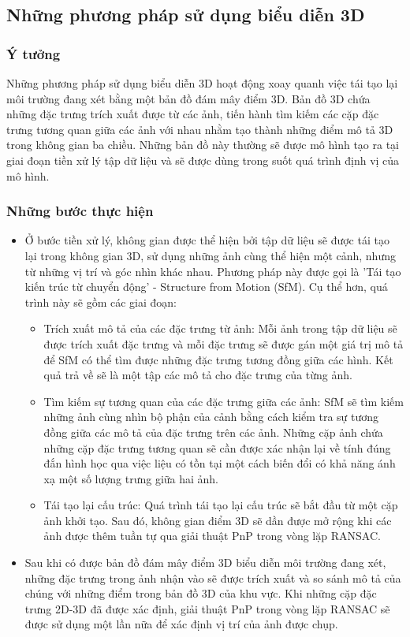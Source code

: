 \subsection{Những phương pháp sử dụng biểu diễn 3D}
\subsubsection*{Ý tưởng}
Những phương pháp sử dụng biểu diễn 3D hoạt động xoay quanh việc tái tạo lại môi trường đang xét bằng một bản đồ đám mây điểm 3D. Bản đồ 3D chứa những đặc trưng trích xuất được từ các ảnh, tiến hành tìm kiếm các cặp đặc trưng tương quan giữa các ảnh với nhau nhằm tạo thành những điểm mô tả 3D trong không gian ba chiều. Những bản đồ này thường sẽ được mô hình tạo ra tại giai đoạn tiền xử lý tập dữ liệu và sẽ được dùng trong suốt quá trình định vị của mô hình.
\subsubsection*{Những bước thực hiện}
\begin{itemize}
    \item Ở bước tiền xử lý, không gian được thể hiện bởi tập dữ liệu sẽ được tái tạo lại trong không gian 3D, sử dụng những ảnh cùng thể hiện một cảnh, nhưng từ những vị trí và góc nhìn khác nhau. Phương pháp này được gọi là 'Tái tạo kiến trúc từ chuyển động' - Structure from Motion (SfM). Cụ thể hơn, quá trình này sẽ gồm các giai đoạn:
          \begin{itemize}
              \item Trích xuất mô tả của các đặc trưng từ ảnh: Mỗi ảnh trong tập dữ liệu sẽ được trích xuất đặc trưng và mỗi đặc trưng sẽ được gán một giá trị mô tả để SfM có thể tìm được những đặc trưng tương đồng giữa các hình. Kết quả trả về sẽ là một tập các mô tả cho đặc trưng của từng ảnh.
              \item Tìm kiếm sự tương quan của các đặc trưng giữa các ảnh: SfM sẽ tìm kiếm những ảnh cùng nhìn bộ phận của cảnh bằng cách kiểm tra sự tương đồng giữa các mô tả của đặc trưng trên các ảnh. Những cặp ảnh chứa những cặp đặc trưng tương quan sẽ cần được xác nhận lại về tính đúng đắn hình học qua việc liệu có tồn tại một cách biến đổi có khả năng ánh xạ một số lượng trưng giữa hai ảnh.
              \item Tái tạo lại cấu trúc: Quá trình tái tạo lại cấu trúc sẽ bắt đầu từ một cặp ảnh khởi tạo. Sau đó, không gian điểm 3D sẽ dần được mở rộng khi các ảnh được thêm tuần tự qua giải thuật PnP trong vòng lặp RANSAC.
          \end{itemize}
    \item Sau khi có được bản đồ đám mây điểm 3D biểu diễn môi trường đang xét, những đặc trưng trong ảnh nhận vào sẽ được trích xuất và so sánh mô tả của chúng với những điểm trong bản đồ 3D của khu vực. Khi những cặp đặc trưng 2D-3D đã được xác định, giải thuật PnP trong vòng lặp RANSAC sẽ được sử dụng một lần nữa để xác định vị trí của ảnh được chụp.
\end{itemize}
